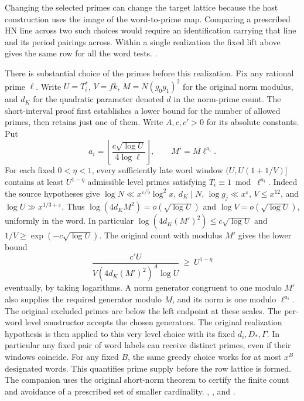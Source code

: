 Changing the selected primes can change the target lattice because
the host construction uses the image of the word-to-prime map.
Comparing a prescribed HN line
across two such choices would require an identification carrying
that line and its period pairings across. Within a single realization
the fixed lift above gives the same row for all the word tests.
.

There is substantial choice of the primes before this realization.
Fix any rational prime \(\ell\). Write \(U=T_i^*\), \(V=fk\),
\(M=N(g_0g_1)^2\) for the original norm modulus, and \(d_K\)
for the quadratic parameter denoted \(d\) in the norm-prime count.
The short-interval proof first establishes a lower bound for the
number of allowed primes, then retains just one of them. Write
\(A,c,c'>0\) for its absolute constants. Put
\[
 a_i=\left\lfloor\frac{c\sqrt{\log U}}{4\log\ell}\right\rfloor,
 \qquad M'=M\ell^{a_i}.
\]
For each fixed \(0<\eta<1\), every sufficiently late word window
\((U,U(1+1/V)]\) contains at least \(U^{1-\eta}\) admissible
level primes satisfying \(T_i\equiv1\bmod\ell^{a_i}\).
Indeed the source hypotheses give
\(\log N\ll x^{\varepsilon/5}\log^2 x\), \(d_K\mid N\),
\(\log g_j\ll x^\varepsilon\), \(V\le x^{12}\), and
\(\log U\gg x^{1/3+\varepsilon}\). Thus
\(\log(4d_KM^2)=o(\sqrt{\log U})\) and
\(\log V=o(\sqrt{\log U})\), uniformly in the word.
In particular \(\log(4d_K(M')^2)\le c\sqrt{\log U}\)
and \(1/V\ge\exp(-c\sqrt{\log U})\). The original count with
modulus \(M'\) gives the lower bound
\[
        \frac{c'U}{V(4d_K(M')^2)^A\log U}
        \ \ge\ U^{1-\eta}
\]
eventually, by taking logarithms. A norm generator congruent to
one modulo \(M'\) also supplies the required generator modulo \(M\),
and its norm is one modulo \(\ell^{a_i}\). The original excluded
primes are below the left endpoint at these scales. The per-word
level constructor accepts the chosen generators. The original
realization hypothesis is then applied to this very level choice
with its fixed \(d_i,D_*,\Gamma\). In particular any
fixed pair of word labels can receive distinct primes, even if
their windows coincide. For any fixed \(B\), the same greedy choice
works for at most \(x^B\) designated words. This quantifies prime
supply before the row lattice is formed. The companion
 uses the original short-norm
theorem to certify the finite count and avoidance of a prescribed
set of smaller cardinality.
,
,
 and
.

